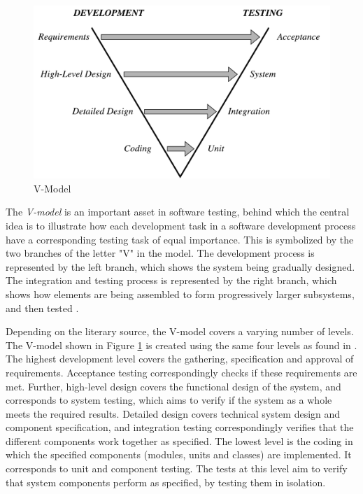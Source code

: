 \begin{figure}[h]
    \centering
    \includegraphics[width=\textwidth]{figures/new/v_model.pdf}
    \caption{V-Model}
    \label{fig.v-model}
\end{figure}


\noindent The \emph{V-model} is an important asset in software testing, behind which the central idea is to illustrate how each development task in a software development process have a corresponding testing task of equal importance. This is symbolized by the two branches of the letter "V" in the model. The development process is represented by the left branch, which shows the system being gradually designed. The integration and testing process is represented by the right branch, which shows how elements are being assembled to form progressively larger subsystems, and then tested \cite{SoftwareTestingFoundations}.

Depending on the literary source, the V-model covers a varying number of levels. The V-model shown in Figure \ref{fig.v-model} is created using the same four levels as found in \cite{systematicSoftwareTesting}. The highest development level covers the gathering, specification and approval of requirements. Acceptance testing correspondingly checks if these requirements are met. Further, high-level design covers the functional design of the system, and corresponds to system testing, which aims to verify if the system as a whole meets the required results. Detailed design covers technical system design and component specification, and integration testing correspondingly verifies that the different components work together as specified. The lowest level is the coding in which the specified components (modules, units and classes) are implemented. It corresponds to unit and component testing. The tests at this level aim to verify that system components perform as specified, by testing them in isolation. \cite{SoftwareTestingFoundations}


